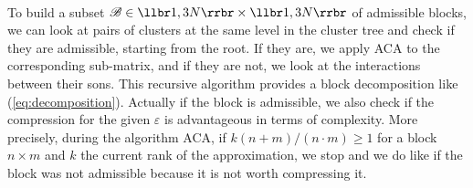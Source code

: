 \quad\\
To build a subset $\mathscr{B} \in \llbr 1,3N \rrbr \times \llbr 1,3N\rrbr $ of admissible blocks, we can look at pairs of clusters at the same level in the cluster tree and check if they are admissible, starting from the root. If they are, we apply ACA to the corresponding sub-matrix, and if they are not, we look at the interactions between their sons. This recursive algorithm provides a block decomposition like (\ref{eq:decomposition}).
Actually if the block is admissible, we also check if the compression for the given $\varepsilon$ is advantageous in terms of complexity. More precisely, during the algorithm ACA, if $k(n+m)/(n\cdot m) \geq 1$ for a block $n\times m$ and $k$ the current rank of the approximation, we stop and we do like if the block was not admissible because it is not worth compressing it.





